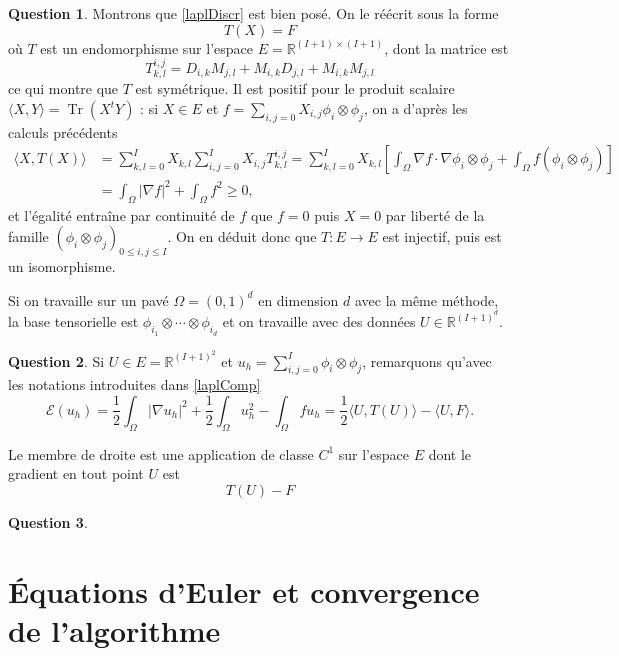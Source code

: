 \documentclass[11pt]{article}
\DeclareMathOperator{\Tr}{Tr}
\newcommand{\RR}{\mathbb{R}}
\theoremstyle{definition}
\newtheorem{ques}{Question}
\begin{document}
\begin{ques}
Montrons que \eqref{laplDiscr} est bien posé. On le réécrit sous la forme
\begin{equation}\tag{c}\label{laplComp}
T(X) = F
\end{equation}
où $T$ est un endomorphisme sur l'espace $E=\RR^{(I+1)\times(I+1)}$, dont la matrice est
\[
T_{k,l}^{i,j} = D_{i,k}M_{j,l} + M_{i,k}D_{j,l} + M_{i,k}M_{j,l}
\]
ce qui montre que $T$ est symétrique. Il est positif pour le produit scalaire $\langle X,Y\rangle = \Tr(X^tY)$ : si $X\in E$ et $f = \sum_{i,j=0}X_{i,j}\phi_i\otimes\phi_j$, on a d'après les calculs précédents
\begin{align*}
\langle X,T(X)\rangle &= \sum_{k,l=0}^IX_{k,l}\sum_{i,j=0}^IX_{i,j}T_{k,l}^{i,j} 
=
\sum_{k,l=0}^IX_{k,l}\left[\int_\Omega \nabla f\cdot \nabla \phi_i\otimes\phi_j + \int_\Omega f(\phi_i\otimes\phi_j) \right] \\
&= \int_\Omega |\nabla f|^2 + \int_\Omega f^2 \geq 0,
\end{align*}
et l'égalité entraîne par continuité de $f$ que $f = 0$ puis $X = 0$ par liberté de la famille $(\phi_i\otimes\phi_j)_{0\leq i,j\leq I}$. On en déduit donc que $T:E\rightarrow E$ est injectif, puis est un isomorphisme.

Si on travaille sur un pavé $\Omega = (0,1)^d$ en dimension $d$ avec la même méthode, la base tensorielle est $\phi_{i_1}\otimes\cdots\otimes\phi_{i_d}$ et on travaille avec des données $U \in \RR^{(I+1)^d}$.

\end{ques}


\begin{ques}
Si $U\in E=\RR^{(I+1)^2}$ et $u_h = \sum_{i,j=0}^I\phi_i\otimes\phi_j$, remarquons qu'avec les notations introduites dans \eqref{laplComp}
\[
\mathcal{E}(u_h) = \frac 12\int_\Omega |\nabla u_h|^2 + \frac 12\int_\Omega u_h^2 - \int_\Omega fu_h = \frac 12\langle U,T(U)\rangle - \langle U,F\rangle.
\]

Le membre de droite est une application de classe $C^1$ sur l'espace $E$ dont le gradient en tout point $U$ est
\[
T(U) - F
\]
\end{ques}


\begin{ques}

\end{ques}



\section{Équations d'Euler et convergence de l'algorithme}
\end{document}
